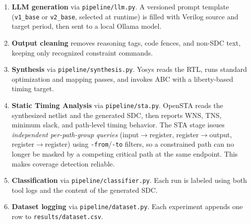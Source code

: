 \documentclass[11pt]{article}
\begin{document}
\begin{enumerate}[leftmargin=*,nosep]
    \item \textbf{LLM generation} via \texttt{pipeline/llm.py}. A versioned prompt template (\texttt{v1\_base} or \texttt{v2\_base}, selected at runtime) is filled with Verilog source and target period, then sent to a local Ollama model.
    \item \textbf{Output cleaning} removes reasoning tags, code fences, and non-SDC text, keeping only recognized constraint commands.
    \item \textbf{Synthesis} via \texttt{pipeline/synthesis.py}. Yosys reads the RTL, runs standard optimization and mapping passes, and invokes ABC with a liberty-based timing target.
    \item \textbf{Static Timing Analysis} via \texttt{pipeline/sta.py}. OpenSTA reads the synthesized netlist and the generated SDC, then reports WNS, TNS, minimum slack, and path-level timing behavior. The STA stage issues \emph{independent per-path-group queries} (input$\to$register, register$\to$output, register$\to$register) using \texttt{-from}/\texttt{-to} filters, so a constrained path can no longer be masked by a competing critical path at the same endpoint. This makes coverage detection reliable.
    \item \textbf{Classification} via \texttt{pipeline/classifier.py}. Each run is labeled using both tool logs and the content of the generated SDC.
    \item \textbf{Dataset logging} via \texttt{pipeline/dataset.py}. Each experiment appends one row to \texttt{results/dataset.csv}.
\end{enumerate}
\end{document}
